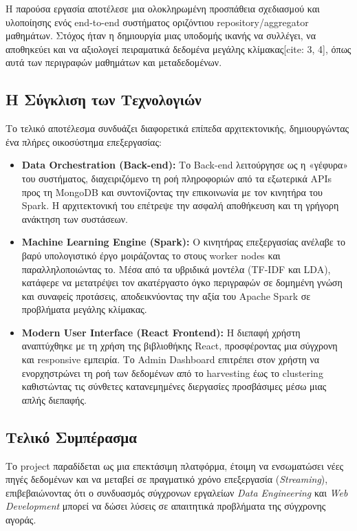 \documentclass[a4paper,12pt]{article}
\begin{document}
Η παρούσα εργασία αποτέλεσε μια ολοκληρωμένη προσπάθεια σχεδιασμού και υλοποίησης ενός end-to-end συστήματος οριζόντιου repository/aggregator μαθημάτων. Στόχος ήταν η δημιουργία μιας υποδομής ικανής να συλλέγει, να αποθηκεύει και να αξιολογεί πειραματικά δεδομένα μεγάλης κλίμακας[cite: 3, 4], όπως αυτά των περιγραφών μαθημάτων και μεταδεδομένων.

\subsection{Η Σύγκλιση των Τεχνολογιών}
Το τελικό αποτέλεσμα συνδυάζει διαφορετικά επίπεδα αρχιτεκτονικής, δημιουργώντας ένα πλήρες οικοσύστημα επεξεργασίας:

\begin{itemize}
    \item \textbf{Data Orchestration (Back-end):} Το Back-end λειτούργησε ως η «γέφυρα» του συστήματος, διαχειριζόμενο τη ροή πληροφοριών από τα εξωτερικά APIs προς τη MongoDB και συντονίζοντας την επικοινωνία με τον κινητήρα του Spark. Η αρχιτεκτονική του επέτρεψε την ασφαλή αποθήκευση και τη γρήγορη ανάκτηση των συστάσεων.
    
    \item \textbf{Machine Learning Engine (Spark):} Ο κινητήρας επεξεργασίας ανέλαβε το βαρύ υπολογιστικό έργο μοιράζοντας το στους worker nodes και παραλληλοποιώντας το. Μέσα από τα υβριδικά μοντέλα (TF-IDF και LDA), κατάφερε να μετατρέψει τον ακατέργαστο όγκο περιγραφών σε δομημένη γνώση και συναφείς προτάσεις, αποδεικνύοντας την αξία του Apache Spark σε προβλήματα μεγάλης κλίμακας.
    
    \item \textbf{Modern User Interface (React Frontend):} Η διεπαφή χρήστη αναπτύχθηκε με τη χρήση της βιβλιοθήκης React, προσφέροντας μια σύγχρονη και responsive εμπειρία. Το Admin Dashboard επιτρέπει στον χρήστη να ενορχηστρώνει τη ροή των δεδομένων από το harvesting έως το clustering καθιστώντας τις σύνθετες κατανεμημένες διεργασίες προσβάσιμες μέσω μιας απλής διεπαφής.
\end{itemize}


\subsection{Τελικό Συμπέρασμα}
Το project παραδίδεται ως μια επεκτάσιμη πλατφόρμα, έτοιμη να ενσωματώσει νέες πηγές δεδομένων και να μεταβεί σε πραγματικό χρόνο επεξεργασία (\textit{Streaming}), επιβεβαιώνοντας ότι ο συνδυασμός σύγχρονων εργαλείων \textit{Data Engineering} και \textit{Web Development} μπορεί να δώσει λύσεις σε απαιτητικά προβλήματα της σύγχρονης αγοράς.
\end{document}
